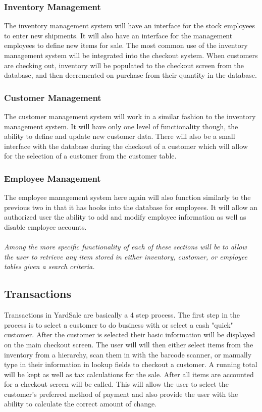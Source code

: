 \documentclass{report}
\begin{document}
    \subsubsection{Inventory Management}
    The inventory management system will have an interface for the
    stock employees to enter new shipments. It will also have an
    interface for the management employees to define new items for
    sale. The most common use of the inventory management system will
    be integrated into the checkout system. When customers are
    checking out, inventory will be populated to the checkout screen
    from the database, and then decremented on purchase from their
    quantity in the database.

    \subsubsection{Customer Management}
    The customer management system will work in a similar fashion to
    the inventory management system. It will have only one level of
    functionality though, the ability to define and update new
    customer data. There will also be a small interface with the
    database during the checkout of a customer which will allow for
    the selection of a customer from the customer table.

    \subsubsection{Employee Management}
    The employee management system here again will also function
    similarly to the previous two in that it has hooks into the
    database for employees. It will allow an authorized user the
    ability to add and modify employee information as well as
    disable employee accounts.\\
    \\

    {\sl Among the more specific functionality of each of these sections
    will be to allow the user to retrieve any item stored in either
    inventory, customer, or employee tables given a search
    criteria.}

    \subsection{Transactions}

    Transactions in YardSale are basically a 4 step process. The first
    step in the process is to select a customer to do business with or
    select a cash "quick" customer. After the customer is selected
    their basic information will be displayed on the main checkout
    screen. The user will will then either select items from the
    inventory from a hierarchy, scan them in with the barcode scanner,
    or manually type in their information in lookup fields to checkout
    a customer. A running total will be kept as well as tax
    calculations for the sale. After all items are accounted for a
    checkout screen will be called. This will allow the user to select
    the customer's preferred method of payment and also provide the
    user with the ability to calculate the correct amount of change.
\end{document}
